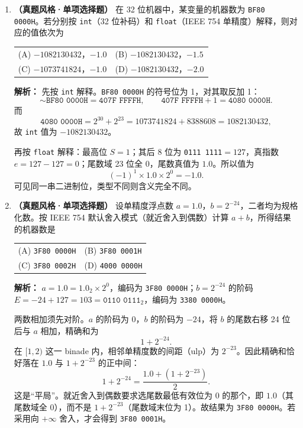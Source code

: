 \begin{enumerate}[resume]

\item \textbf{（真题风格·单项选择题）} 在 32 位机器中，某变量的机器数为 \texttt{BF80 0000H}。若分别按 \texttt{int}（32 位补码）和 \texttt{float}（IEEE 754 单精度）解释，则对应的值依次为
\begin{center}
\begin{tabular}{ll}
(A) $-1082130432$，$-1.0$ & (B) $-1082130432$，$-1.5$ \\[4pt]
(C) $-1073741824$，$-1.0$ & (D) $-1082130432$，$-2.0$
\end{tabular}
\end{center}

\ifshowsolutions\par\noindent\textbf{解析：} 先按 \texttt{int} 解释。\texttt{BF80 0000H} 的符号位为 1，对其取反加 1：
\[
\sim\!\texttt{BF80 0000H}=\texttt{407F FFFFH},\qquad
\texttt{407F FFFFH}+1=\texttt{4080 0000H}.
\]
而
\[
\texttt{4080 0000H}=2^{30}+2^{23}=1073741824+8388608=1082130432,
\]
故 \texttt{int} 值为 $-1082130432$。

再按 \texttt{float} 解释：最高位 $S=1$；其后 8 位为 \texttt{0111 1111}$=127$，真指数 $e=127-127=0$；尾数域 23 位全 0，尾数真值为 $1.0$。所以值为
\[
(-1)^1\times1.0\times2^{0}=-1.0.
\]
可见同一串二进制位，类型不同则含义完全不同。\else \answerarea[8] \fi

\item \textbf{（真题风格·单项选择题）} 设单精度浮点数 $a=1.0$，$b=2^{-24}$，二者均为规格化数。按 IEEE 754 默认舍入模式（就近舍入到偶数）计算 $a+b$，所得结果的机器数是
\begin{center}
\begin{tabular}{ll}
(A) \texttt{3F80 0000H} & (B) \texttt{3F80 0001H} \\[4pt]
(C) \texttt{3F80 0002H} & (D) \texttt{4000 0000H}
\end{tabular}
\end{center}

\ifshowsolutions\par\noindent\textbf{解析：} $a=1.0=1.0_2\times2^{0}$，编码为 \texttt{3F80 0000H}；$b=2^{-24}$ 的阶码 $E=-24+127=103=\texttt{0110 0111}_2$，编码为 \texttt{3380 0000H}。

两数相加须先对阶。$a$ 的阶码为 0，$b$ 的阶码为 $-24$，将 $b$ 的尾数右移 24 位后与 $a$ 相加，精确和为
\[
1+2^{-24}.
\]
在 $[1,2)$ 这一 binade 内，相邻单精度数的间距（ulp）为 $2^{-23}$。因此精确和恰好落在 $1.0$ 与 $1+2^{-23}$ 的正中间：
\[
1+2^{-24}=\frac{1.0+(1+2^{-23})}{2}.
\]
这是“平局”。就近舍入到偶数要求选尾数最低有效位为 0 的那个，即 $1.0$（其尾数域全 0），而不是 $1+2^{-23}$（尾数域末位为 1）。故结果为 \texttt{3F80 0000H}。若采用向 $+\infty$ 舍入，才会得到 \texttt{3F80 0001H}。\else \answerarea[8] \fi


\end{enumerate}
